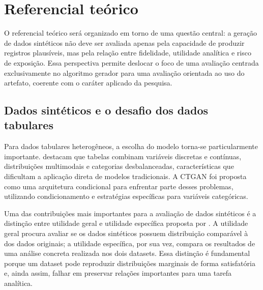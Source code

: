 
\section{Referencial teórico}

O referencial teórico será organizado em torno de uma questão central: a geração
de dados sintéticos não deve ser avaliada apenas pela capacidade de produzir
registros plausíveis, mas pela relação entre fidelidade, utilidade analítica e
risco de exposição. Essa perspectiva permite deslocar o foco de uma avaliação
centrada exclusivamente no algoritmo gerador para uma avaliação orientada ao uso
do artefato, coerente com o caráter aplicado da pesquisa.

\subsection{Dados sintéticos e o desafio dos dados tabulares}

Para dados tabulares heterogêneos, a escolha do modelo torna-se particularmente
importante.  destacam que tabelas combinam variáveis discretas
e contínuas, distribuições multimodais e categorias desbalanceadas,
características que dificultam a aplicação direta de modelos tradicionais. A
CTGAN foi proposta como uma arquitetura condicional para enfrentar parte desses
problemas, utilizando condicionamento e estratégias específicas para variáveis
categóricas.

Uma das contribuições mais importantes para a avaliação de dados sintéticos é a
distinção entre utilidade geral e utilidade específica proposta por
. A utilidade geral procura avaliar se os dados sintéticos
possuem distribuição comparável à dos dados originais; a utilidade específica,
por sua vez, compara os resultados de uma análise concreta realizada nos dois
datasets. Essa distinção é fundamental porque um dataset pode reproduzir
distribuições marginais de forma satisfatória e, ainda assim, falhar em preservar
relações importantes para uma tarefa analítica.

